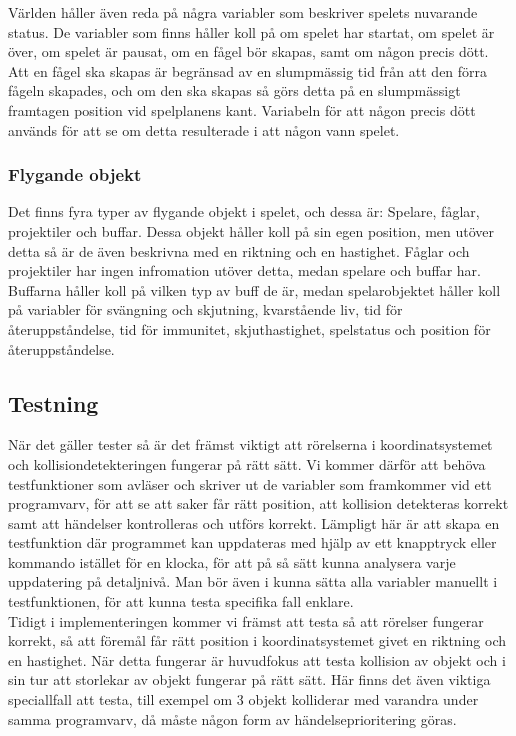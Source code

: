 \documentclass[12pt,a4paper]{article}
\begin{document}
Världen håller även reda på några variabler som beskriver spelets nuvarande status. De variabler som finns håller koll på om spelet har startat, om spelet är över, om spelet är pausat, om en fågel bör skapas, samt om någon precis dött. Att en fågel ska skapas är begränsad av en slumpmässig tid från att den förra fågeln skapades, och om den ska skapas så görs detta på en slumpmässigt framtagen position vid spelplanens kant. Variabeln för att någon precis dött används för att se om detta resulterade i att någon vann spelet.

\subsubsection{Flygande objekt}
Det finns fyra typer av flygande objekt i spelet, och dessa är: Spelare, fåglar, projektiler och buffar. Dessa objekt håller koll på sin egen position, men utöver detta så är de även beskrivna med en riktning och en hastighet. Fåglar och projektiler har ingen infromation utöver detta, medan spelare och buffar har. Buffarna håller koll på vilken typ av buff de är, medan spelarobjektet håller koll på variabler för svängning och skjutning, kvarstående liv, tid för återuppståndelse, tid för immunitet, skjuthastighet, spelstatus och position för återuppståndelse.

\subsection{Testning}
När det gäller tester så är det främst viktigt att rörelserna i koordinatsystemet och kollisiondetekteringen fungerar på rätt sätt. Vi kommer därför att behöva testfunktioner som avläser och skriver ut de variabler som framkommer vid ett programvarv, för att se att saker får rätt position, att kollision detekteras korrekt samt att händelser kontrolleras och utförs korrekt. Lämpligt här är att skapa en testfunktion där programmet kan uppdateras med hjälp av ett knapptryck eller kommando istället för en klocka, för att på så sätt kunna analysera varje uppdatering på detaljnivå. Man bör även i kunna sätta alla variabler manuellt i testfunktionen, för att kunna testa specifika fall enklare. \\

Tidigt i implementeringen kommer vi främst att testa så att rörelser fungerar korrekt, så att föremål får rätt position i koordinatsystemet givet en riktning och en hastighet. När detta fungerar är huvudfokus att testa kollision av objekt och i sin tur att storlekar av objekt fungerar på rätt sätt. Här finns det även viktiga speciallfall att testa, till exempel om 3 objekt kolliderar med varandra under samma programvarv, då måste någon form av händelseprioritering göras. \\
\end{document}
